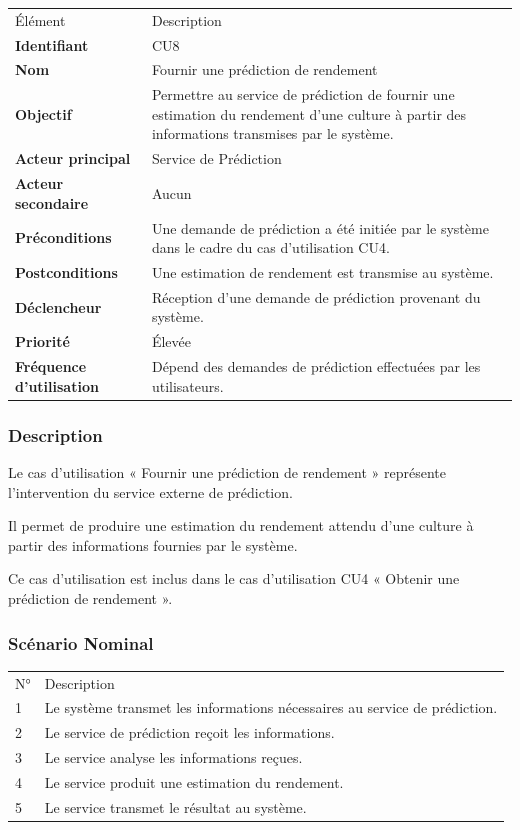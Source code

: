 \documentclass[
]{article}
\begin{document}
\begin{longtable}[]{@{}ll@{}}
\toprule
\endhead
Élément & Description \\
\textbf{Identifiant} & CU8 \\
\textbf{Nom} & Fournir une prédiction de rendement \\
\textbf{Objectif} & Permettre au service de prédiction de fournir une
estimation du rendement d'une culture à partir des informations
transmises par le système. \\
\textbf{Acteur principal} & Service de Prédiction \\
\textbf{Acteur secondaire} & Aucun \\
\textbf{Préconditions} & Une demande de prédiction a été initiée par le
système dans le cadre du cas d'utilisation CU4. \\
\textbf{Postconditions} & Une estimation de rendement est transmise au
système. \\
\textbf{Déclencheur} & Réception d'une demande de prédiction provenant
du système. \\
\textbf{Priorité} & Élevée \\
\textbf{Fréquence d'utilisation} & Dépend des demandes de prédiction
effectuées par les utilisateurs. \\
\bottomrule
\end{longtable}

\hypertarget{description-6}{%
\subsubsection{Description}\label{description-6}}

Le cas d'utilisation « Fournir une prédiction de rendement » représente
l'intervention du service externe de prédiction.

Il permet de produire une estimation du rendement attendu d'une culture
à partir des informations fournies par le système.

Ce cas d'utilisation est inclus dans le cas d'utilisation CU4 « Obtenir
une prédiction de rendement ».

\hypertarget{scuxe9nario-nominal-7}{%
\subsubsection{Scénario Nominal}\label{scuxe9nario-nominal-7}}

\begin{longtable}[]{@{}ll@{}}
\toprule
\endhead
N° & Description \\
1 & Le système transmet les informations nécessaires au service de
prédiction. \\
2 & Le service de prédiction reçoit les informations. \\
3 & Le service analyse les informations reçues. \\
4 & Le service produit une estimation du rendement. \\
5 & Le service transmet le résultat au système. \\
\bottomrule
\end{longtable}
\end{document}
